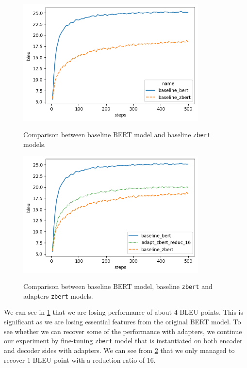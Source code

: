 \begin{figure}[]
    {\includegraphics[width=0.85\textwidth]{img/baseline_zbert.png}}
    \centering
    \caption{Comparison between baseline BERT model and baseline \texttt{zbert} models.}
    \label{img:baseline_zbert}
\end{figure}

\begin{figure}[]
    {\includegraphics[width=0.85\textwidth]{img/adapter_zbert.png}}
    \centering
    \caption{Comparison between baseline BERT model, baseline \texttt{zbert} and adapters \texttt{zbert} models.}
    \label{img:adapter_zbert}
\end{figure}

We can see in \cref{img:baseline_zbert} that we are losing performance of about 4 BLEU points. This is significant as we are losing essential features from the original BERT model. To see whether we can recover some of the performance with adapters, we continue our experiment by fine-tuning \texttt{zbert} model that is instantiated on both encoder and decoder sides with adapters. We can see from \cref{img:adapter_zbert} that we only managed to recover 1 BLEU point with a reduction ratio of 16.

